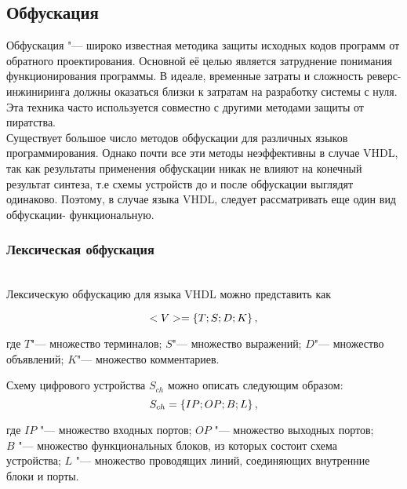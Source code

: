 \subsection{Обфускация}
\label{page:domain:obfucation}
Обфускация "--- широко известная методика защиты исходных кодов программ от обратного проектирования\cite{collberg}. Основной её целью является затруднение понимания функционирования программы. В идеале, временные затраты и сложность реверс-инжиниринга должны оказаться близки к затратам на разработку системы с нуля\cite{sergeichik_ivaniuk}.
Эта техника часто используется совместно с другими методами защиты от пиратства.\\
Существует большое число методов обфускации для различных языков программирования. Однако почти все эти методы неэффективны в случае VHDL, так как результаты применения обфускации никак не влияют на конечный результат синтеза, т.е схемы устройств до и после обфускации выглядят одинаково. Поэтому, в случае языка VHDL, следует рассматривать еще один вид обфускации- функциональную\cite{ivaniuk}.

\subsubsection{Лексическая обфускация}~\\
\label{page:domain:lexical}
Лексическую обфускацию для языка VHDL можно представить как

\begin{equation}
  <V> = \{T;S;D;K\} \text{\,,}
  \label{eq:domain:lexical:view}
\end{equation}
\begin{explanation}
  где $T$"--- множество терминалов; $S$"--- множество выражений; $D$"--- множество\\ объявлений; $K$"--- множество комментариев.
\end{explanation}
Схему цифрового устройства $S_{ch}$ можно описать следующим образом\cite{ivaniuk}:
\begin{equation}
  S_{ch}= \{IP;OP;B;L\} \text{\,,}
  \label{eq:domain:lexical:schema}
\end{equation}
\begin{explanation}
  где $IP$ "--- множество входных портов; $OP$ "--- множество выходных портов;\\$B$ "--- множество функциональных блоков, из которых состоит схема\\ устройства; $L$ "--- множество проводящих линий, соединяющих внутренние\\ блоки и порты.
\end{explanation}

